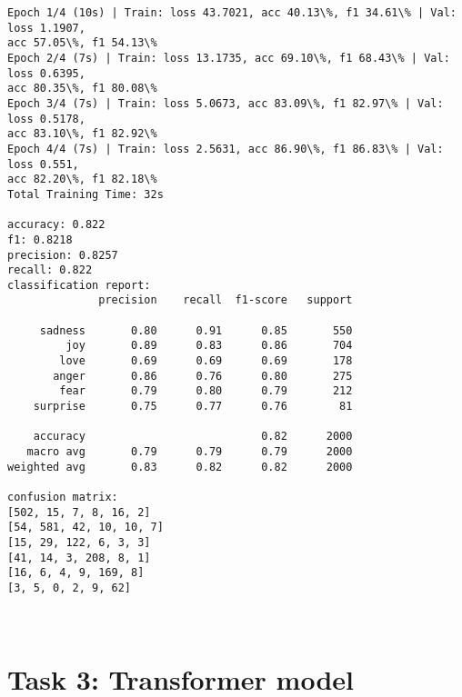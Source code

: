 \documentclass[8pt]{extarticle}
\begin{document}
    \begin{Verbatim}[commandchars=\\\{\}]
Epoch 1/4 (10s) | Train: loss 43.7021, acc 40.13\%, f1 34.61\% | Val: loss 1.1907,
acc 57.05\%, f1 54.13\%
Epoch 2/4 (7s) | Train: loss 13.1735, acc 69.10\%, f1 68.43\% | Val: loss 0.6395,
acc 80.35\%, f1 80.08\%
Epoch 3/4 (7s) | Train: loss 5.0673, acc 83.09\%, f1 82.97\% | Val: loss 0.5178,
acc 83.10\%, f1 82.92\%
Epoch 4/4 (7s) | Train: loss 2.5631, acc 86.90\%, f1 86.83\% | Val: loss 0.551,
acc 82.20\%, f1 82.18\%
Total Training Time: 32s

accuracy: 0.822
f1: 0.8218
precision: 0.8257
recall: 0.822
classification report:
              precision    recall  f1-score   support

     sadness       0.80      0.91      0.85       550
         joy       0.89      0.83      0.86       704
        love       0.69      0.69      0.69       178
       anger       0.86      0.76      0.80       275
        fear       0.79      0.80      0.79       212
    surprise       0.75      0.77      0.76        81

    accuracy                           0.82      2000
   macro avg       0.79      0.79      0.79      2000
weighted avg       0.83      0.82      0.82      2000

confusion matrix:
[502, 15, 7, 8, 16, 2]
[54, 581, 42, 10, 10, 7]
[15, 29, 122, 6, 3, 3]
[41, 14, 3, 208, 8, 1]
[16, 6, 4, 9, 169, 8]
[3, 5, 0, 2, 9, 62]

    \end{Verbatim}

    \begin{center}
    \end{center}
    { \hspace*{\fill} \\}
    
    \section{Task 3: Transformer model}\label{task-3-transformer-model}
\end{document}
